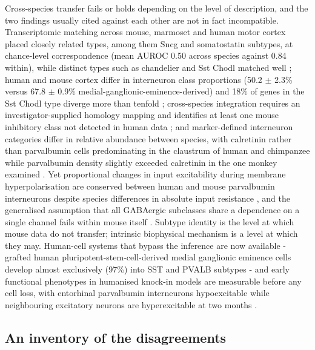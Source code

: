 \documentclass[11pt]{article}
\begin{document}
Cross-species transfer fails or holds depending on the level of description, and the two findings usually cited against each other are not in fact incompatible. Transcriptomic matching across mouse, marmoset and human motor cortex placed closely related types, among them Sncg and somatostatin subtypes, at chance-level correspondence (mean AUROC 0.50 across species against 0.84 within), while distinct types such as chandelier and Sst Chodl matched well \citep{Bakken2021}; human and mouse cortex differ in interneuron class proportions (50.2 $\pm$ 2.3\% versus 67.8 $\pm$ 0.9\% medial-ganglionic-eminence-derived) and 18\% of genes in the Sst Chodl type diverge more than tenfold \citep{Hodge2019}; cross-species integration requires an investigator-supplied homology mapping and identifies at least one mouse inhibitory class not detected in human data \citep{Liu2022}; and marker-defined interneuron categories differ in relative abundance between species, with calretinin rather than parvalbumin cells predominating in the claustrum of human and chimpanzee while parvalbumin density slightly exceeded calretinin in the one monkey examined \citep{Pirone2014}. Yet proportional changes in input excitability during membrane hyperpolarisation are conserved between human and mouse parvalbumin interneurons despite species differences in absolute input resistance \citep{Furdan2026}, and the generalised assumption that all GABAergic subclasses share a dependence on a single channel fails within mouse itself \citep{Liebergall2024}. Subtype identity is the level at which mouse data do not transfer; intrinsic biophysical mechanism is a level at which they may. Human-cell systems that bypass the inference are now available - grafted human pluripotent-stem-cell-derived medial ganglionic eminence cells develop almost exclusively (97\%) into SST and PVALB subtypes \citep{Bershteyn2025} - and early functional phenotypes in humanised knock-in models are measurable before any cell loss, with entorhinal parvalbumin interneurons hypoexcitable while neighbouring excitatory neurons are hyperexcitable at two months \citep{Gonzalez2026}.

\subsection{An inventory of the disagreements}
\label{sec-11-inventory}
\end{document}

